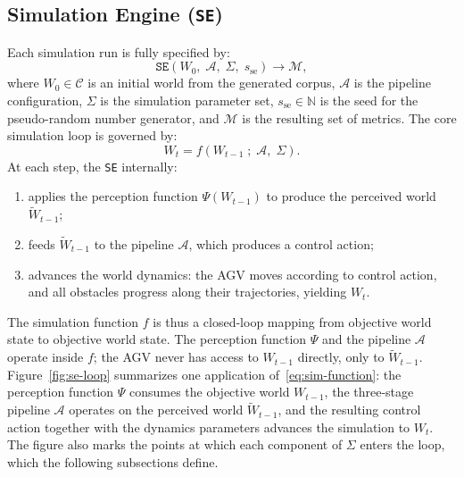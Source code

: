 \documentclass[conference]{IEEEtran}
\begin{document}
\subsection{Simulation Engine (\texttt{SE})}
\label{sec:simulation-engine}
Each simulation run is fully specified by:
\begin{equation}
\label{eq:invocation}
    \texttt{SE}(W_0,\; \mathcal{A},\; \Sigma,\; s_{\text{se}}) \to \mathcal{M},
\end{equation}
where $W_0 \in \mathcal{C}$ is an initial world from the generated corpus, $\mathcal{A}$ is the pipeline configuration, $\Sigma$ is the simulation parameter set, $s_{\text{se}} \in \mathbb{N}$ is the seed for the pseudo-random number generator, and $\mathcal{M}$ is the resulting set of metrics.
The core simulation loop is governed by:
\begin{equation}
\label{eq:sim-function}
    W_t = f\!\left(W_{t-1} \;;\; \mathcal{A},\; \Sigma\right).
\end{equation}
At each step, the \texttt{SE} internally:
\begin{enumerate}
    \item applies the perception function $\Psi(W_{t-1})$ to produce the perceived world $\tilde{W}_{t-1}$;
    \item feeds $\tilde{W}_{t-1}$ to the pipeline $\mathcal{A}$, which produces a control action;
    \item advances the world dynamics: the AGV moves according to control action, and all obstacles progress along their trajectories, yielding $W_t$.
\end{enumerate}
The simulation function $f$ is thus a closed-loop mapping from objective world state to objective world state. The perception function $\Psi$ and the pipeline $\mathcal{A}$ operate inside $f$; the AGV never has access to $W_{t-1}$ directly, only to $\tilde{W}_{t-1}$.
Figure~\ref{fig:se-loop} summarizes one application of~\eqref{eq:sim-function}: the perception function $\Psi$ consumes the objective world $W_{t-1}$, the three-stage pipeline $\mathcal{A}$ operates on the perceived world $\tilde{W}_{t-1}$, and the resulting control action together with the dynamics parameters advances the simulation to $W_t$. The figure also marks the points at which each component of $\Sigma$
enters the loop, which the following subsections define.
 
\end{document}
